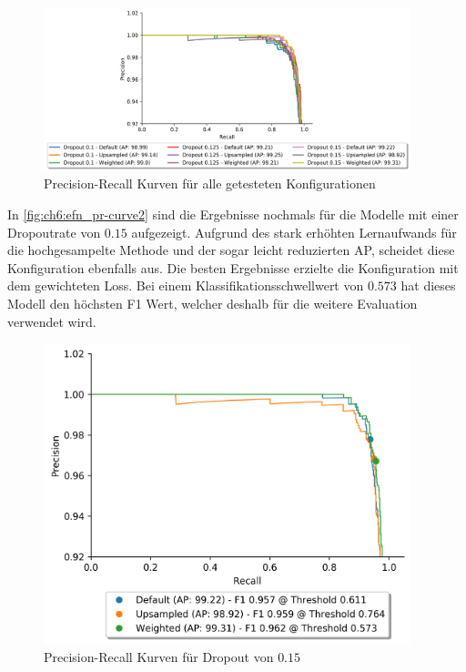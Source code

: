 \begin{figure}[ht]
    \begin{small}
        \begin{center}
            \includegraphics[width=0.95\textwidth]{figures/chapter_6/efnN5-pr_curve}
        \end{center}
        \caption{Precision-Recall Kurven für alle getesteten Konfigurationen}
        \label{fig:ch6:efn_pr-curve}
    \end{small}
\end{figure}

In \autoref{fig:ch6:efn_pr-curve2} sind die Ergebnisse nochmals für die Modelle mit einer Drop\-out\-rate von $0.15$ aufgezeigt.
Aufgrund des stark erhöhten Lernaufwands für die hochgesampelte Methode und der sogar leicht reduzierten AP, scheidet diese Konfiguration ebenfalls aus.
Die besten Ergebnisse erzielte die Konfiguration mit dem gewichteten Loss.
Bei einem Klassifikationsschwellwert von $0.573$ hat dieses Modell den höchsten F1 Wert, welcher deshalb für die weitere Evaluation verwendet wird.

\begin{figure}[H]
    \begin{small}
        \begin{center}
            \includegraphics[width=0.95\textwidth]{figures/chapter_6/efnN5-pr_curve2}
        \end{center}
        \caption{Precision-Recall Kurven für Dropout von $0.15$}
        \label{fig:ch6:efn_pr-curve2}
    \end{small}
\end{figure}


